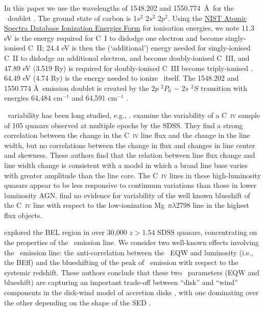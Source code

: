 \documentclass[a4paper,fleqn,usenatbib]{mnras}
\begin{document}
In this paper we use the wavelengths of 1548.202 and 1550.774~\AA\ for
the \civ\ doublet \citep{Kramida2018}. The ground state of carbon is
1$s^2$ 2$s^2$ 2$p^2$.  Using the
\href{https://physics.nist.gov/PhysRefData/ASD/ionEnergy.html}{NIST
Atomic Spectra Database Ionization Energies Form} for ionisation
energies, we note 11.3 eV is the energy required for C~I to dislodge
one electron and become singly-ionised C~II; 24.4 eV is then the
(`additional') energy needed for singly-ionised C~II to dislodge an
additional electron, and become doubly-ionised C~III, and 47.89 eV
(3.519 Ry) is required for doubly-ionised C~III become triply-ionised
\civ.  64.49 eV (4.74 Ry) is the energy needed to ionize \civ\
itself. The 1548.202 and 1550.774 \AA\ emission doublet is created by
the 2$p$ $^{2}P_{0}$ $-$ 2$s$ $^{2}S$ transition with energies 64,484
cm$^{-1}$ and 64,591 cm$^{-1}$ \citep[e.g.][]{Moore1993}.
 
\civ\ variability has been long studied, e.g., \citet[][]{Baldwin1977,
Gaskell1982, Gregory1982, Wilkes1986, Espey1989, Espey1990Erratum,
ZhengSulentic1990, Corbin1990, Corbin1991, Weymann1991,
Dimitrijevic1992, TytlerFan1992, Wills1993, Brotherton1994, Osmer1994,
Laor1995, McIntosh1999, Nazarova2003}.  \citet{Wilhite2006} examine
the variability of a C~\textsc{iv} sample of 105 quasars observed at
multiple epochs by the SDSS.  They find a strong correlation between
the change in the C~\textsc{iv} line flux and the change in the line
width, but no correlations between the change in flux and changes in
line center and skewness.  These authors find that the relation
between line flux change and line width change is consistent with a
model in which a broad line base varies with greater amplitude than
the line core. The C~\textsc{iv} lines in these high-luminosity
quasars appear to be less responsive to continuum variations than
those in lower luminosity AGN.  \citet{Wilhite2006} find no evidence
for variability of the well known blueshift of the C~\textsc{iv} line
with respect to the low-ionization Mg~\textsc{ii}$\lambda$2798 line in
the highest flux objects.

\citet{Richards2011} explored the BEL region in over 30,000 $z > 1.54$ SDSS
quasars, concentrating on the properties of the \civ\ emission
line. We consider two well-known effects involving the \civ\ emission
line: the anti-correlation between the \civ\ EQW and luminosity (i.e.,
the BEff) and the blueshifting of the peak of \civ\ emission with
respect to the systemic redshift. These authors conclude that these
two \civ\ parameters (EQW and blueshift) are capturing an important
trade-off between ``disk'' and ``wind'' components in the disk-wind
model of accretion disks \citep[e.g.,][]{Murray1995, Elvis2000,
Proga2000}, with one dominating over the other depending on the shape
of the SED \citep[][strong \civ\ EQW indicates a more ionizing SED and
large \civ\ blueshift indicating a less ionizing SED ]{Leighly2004b}.
\end{document}
